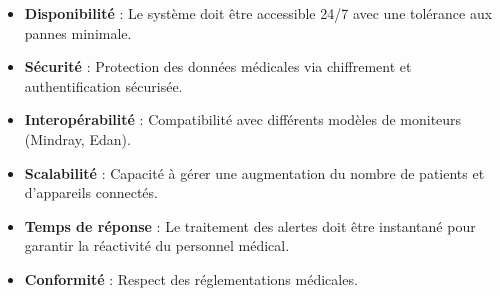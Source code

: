 \begin{itemize}
    \item \textbf{Disponibilité} : Le système doit être accessible 24/7 avec une tolérance aux pannes minimale.
    \item \textbf{Sécurité} : Protection des données médicales via chiffrement et authentification sécurisée.
    \item \textbf{Interopérabilité} : Compatibilité avec différents modèles de moniteurs (Mindray, Edan).
    \item \textbf{Scalabilité} : Capacité à gérer une augmentation du nombre de patients et d’appareils connectés.
    \item \textbf{Temps de réponse} : Le traitement des alertes doit être instantané pour garantir la réactivité du personnel médical.
    \item \textbf{Conformité} : Respect des réglementations médicales.
\end{itemize}
